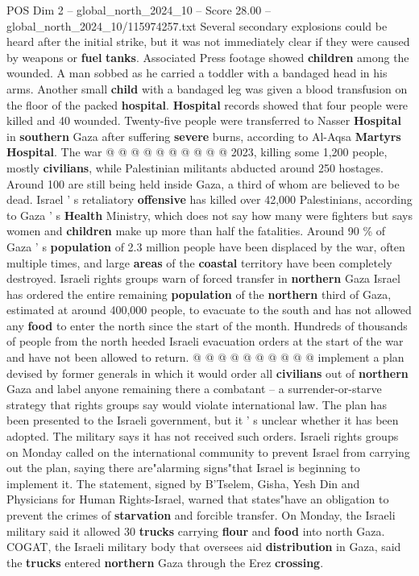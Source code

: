 \begin{textsample}{POS Dim 2 – global\_north\_2024\_10 – Score 28.00 – global\_north\_2024\_10/115974257.txt}
Several secondary explosions could be heard after the initial strike, but it was not immediately clear if they were caused by weapons or \textbf{fuel} \textbf{tanks}.
Associated Press footage showed \textbf{children} among the wounded.
A man sobbed as he carried a toddler with a bandaged head in his arms.
Another small \textbf{child} with a bandaged leg was given a blood transfusion on the floor of the packed \textbf{hospital}. \textbf{Hospital} records showed that four people were killed and 40 wounded.
Twenty-five people were transferred to Nasser \textbf{Hospital} in \textbf{southern} Gaza after suffering \textbf{severe} burns, according to Al-Aqsa \textbf{Martyrs} \textbf{Hospital}.
The war @ @ @ @ @ @ @ @ @ @ 2023, killing some 1,200 people, mostly \textbf{civilians}, while Palestinian militants abducted around 250 hostages.
Around 100 are still being held inside Gaza, a third of whom are believed to be dead.
Israel ' s retaliatory \textbf{offensive} has killed over 42,000 Palestinians, according to Gaza ' s \textbf{Health} Ministry, which does not say how many were fighters but says women and \textbf{children} make up more than half the fatalities.
Around 90 \% of Gaza ' s \textbf{population} of 2.3 million people have been displaced by the war, often multiple times, and large \textbf{areas} of the \textbf{coastal} territory have been completely destroyed.
Israeli rights groups warn of forced transfer in \textbf{northern} Gaza Israel has ordered the entire remaining \textbf{population} of the \textbf{northern} third of Gaza, estimated at around 400,000 people, to evacuate to the south and has not allowed any \textbf{food} to enter the north since the start of the month.
Hundreds of thousands of people from the north heeded Israeli evacuation orders at the start of the war and have not been allowed to return. @ @ @ @ @ @ @ @ @ @ implement a plan devised by former generals in which it would order all \textbf{civilians} out of \textbf{northern} Gaza and label anyone remaining there a combatant -- a surrender-or-starve strategy that rights groups say would violate international law.
The plan has been presented to the Israeli government, but it ' s unclear whether it has been adopted.
The military says it has not received such orders.
Israeli rights groups on Monday called on the international community to prevent Israel from carrying out the plan, saying there are"alarming signs"that Israel is beginning to implement it.
The statement, signed by B'Tselem, Gisha, Yesh Din and Physicians for Human Rights-Israel, warned that states"have an obligation to prevent the crimes of \textbf{starvation} and forcible transfer.
On Monday, the Israeli military said it allowed 30 \textbf{trucks} carrying \textbf{flour} and \textbf{food} into north Gaza.
COGAT, the Israeli military body that oversees aid \textbf{distribution} in Gaza, said the \textbf{trucks} entered \textbf{northern} Gaza through the Erez \textbf{crossing}.

\end{textsample}

